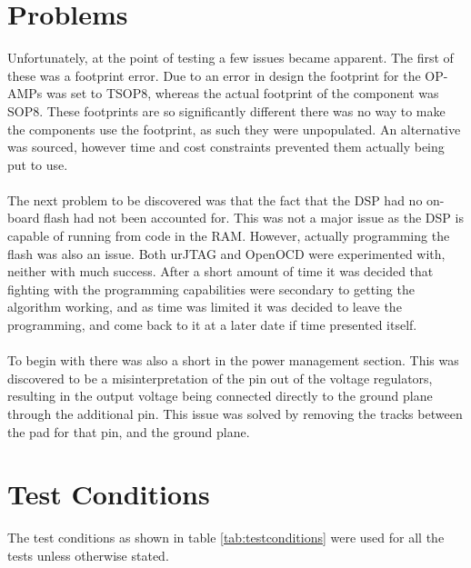 \section{Problems}
\label{ssec:testHWprobs}
Unfortunately, at the point of testing a few issues became apparent.
The first of these was a footprint error.
Due to an error in design the footprint for the OP-AMPs was set to TSOP8, whereas the actual footprint of the component was SOP8.
These footprints are so significantly different there was no way to make the components use the footprint, as such they were unpopulated.
An alternative was sourced, however time and cost constraints prevented them actually being put to use.
\\
\\
The next problem to be discovered was that the fact that the DSP had no on-board flash had not been accounted for.
This was not a major issue as the DSP is capable of running from code in the RAM.
However, actually programming the flash was also an issue.
Both urJTAG and OpenOCD were experimented with, neither with much success.
After a short amount of time it was decided that fighting with the programming capabilities were secondary to getting the algorithm working, and as time was limited it was decided to leave the programming, and come back to it at a later date if time presented itself.
\\
\\
To begin with there was also a short in the power management section.
This was discovered to be a misinterpretation of the pin out of the voltage regulators, resulting in the output voltage being connected directly to the ground plane through the additional pin.
This issue was solved by removing the tracks between the pad for that pin, and the ground plane.

\section{Test Conditions}
\label{ssec:testHWconds}
The test conditions as shown in table \ref{tab:testconditions} were used for all the tests unless otherwise stated.

